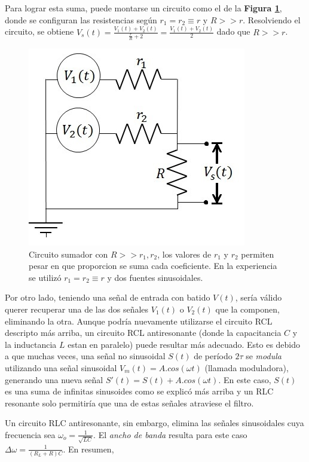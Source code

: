 \documentclass[11pt,a4paper]{article}
\begin{document}
Para lograr esta suma, puede montarse un circuito como el de la \textbf{Figura \ref{fig:Sumador}}, donde se configuran las resistencias según $r_1 = r_2 \equiv r$ y $R>>r$. Resolviendo el circuito, se obtiene $V_s(t) = \frac{V_1(t)+V_2(t)}{\frac{r}{R}+2} = \frac{V_1(t)+V_2(t)}{2}$ dado que $R>>r$.

\begin{figure}[h]
\centering
\includegraphics[scale=0.7]{Sumador}
\caption{Circuito sumador con $R>>r_1,r_2$, los valores de $r_1$ y $r_2$ permiten pesar en que proporcion se suma cada coeficiente. En la experiencia se utilizó $r_1 = r_2 \equiv r$ y dos fuentes sinusoidales.}
\label{fig:Sumador}
\end{figure}

Por otro lado, teniendo una señal de entrada con batido $V(t)$, sería válido querer recuperar una de las dos señales $V_1(t)$ o $V_2(t)$ que la componen, eliminando la otra. Aunque podría nuevamente utilizarse el circuito RCL descripto más arriba, un circuito RCL antiresonante (donde la capacitancia $C$ y la inductancia $L$ estan en paralelo) puede resultar más adecuado. Esto es debido a que muchas veces, una señal no sinusoidal $S(t)$ de período $2\tau$ se \textit{modula} utilizando una señal sinusoidal $V_m(t) = A.cos(\omega t)$ (llamada moduladora), generando una nueva señal $S'(t) = S(t)+A.cos(\omega t)$. En este caso, $S(t)$ es una suma de infinitas sinusoides como se explicó más arriba y un RLC resonante solo permitiría que una de estas señales atraviese el filtro.

Un circuito RLC antiresonante, sin embargo, elimina las señales sinusoidales cuya frecuencia sea $\omega_o = \frac{1}{\sqrt{LC}}$. El \textit{ancho de banda} resulta para este caso $\Delta\omega = \frac{1}{(R_L+R)C}$. En resumen,
\end{document}

